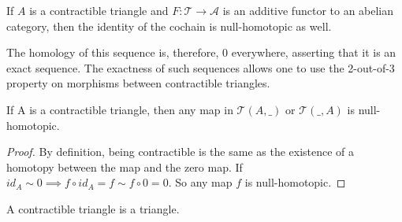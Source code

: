     \begin{remark}
        If $A$ is a contractible triangle and $F:\mathcal{T}\rightarrow \mathcal{A}$ is an additive functor to an abelian category, then the identity of the cochain is null-homotopic as well.
        \begin{center}
        \end{center}
        The homology of this sequence is, therefore, $0$ everywhere, asserting that it is an exact sequence.
        The exactness of such sequences allows one to use the 2-out-of-3 property on morphisms between contractible triangles.
    \end{remark}

    \begin{corollary}
        If A is a contractible triangle, then any map in $\mathcal{T}(A,\_)$ or $\mathcal{T}(\_,A)$ is null-homotopic.
    \end{corollary}

    \begin{proof}
        By definition, being contractible is the same as the existence of a homotopy between the map and the zero map. If $id_A\sim 0 \implies f\circ id_A = f \sim f\circ 0 = 0$. So any map $f$ is null-homotopic.
    \end{proof}

    \begin{lemma}
        A contractible triangle is a triangle.
    \end{lemma}

